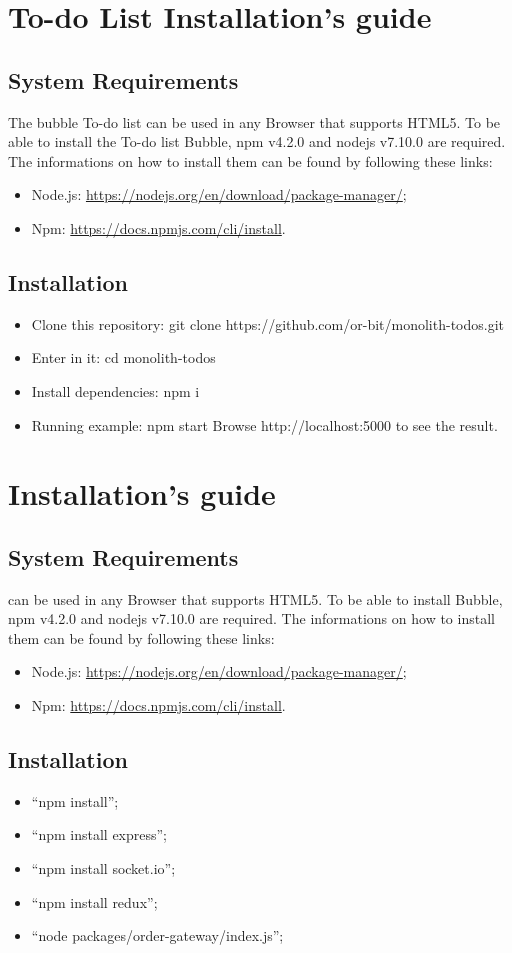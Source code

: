 \section{To-do List Installation's guide}

\subsection{System Requirements}
The bubble To-do list can be used in any Browser that supports HTML5. To be able to install the To-do list Bubble, npm v4.2.0 and nodejs v7.10.0 are required. The informations on how to install them can be found by following these links:
\begin{itemize}
	\item Node.js: \url{https://nodejs.org/en/download/package-manager/};
	\item Npm: \url{https://docs.npmjs.com/cli/install}.
\end{itemize}

\subsection{Installation}
\begin{itemize}
\item Clone this repository: git clone https://github.com/or-bit/monolith-todos.git
\item Enter in it: cd monolith-todos
\item Install dependencies: npm i
\item Running example: npm start Browse http://localhost:5000 to see the result.
\end{itemize}

\section{\DemoName{} Installation's guide}

\subsection{ \DemoName{} System Requirements}
\DemoName{} can be used in any Browser that supports HTML5. 
To be able to install \DemoName{} Bubble, npm v4.2.0 and nodejs v7.10.0 are required. The informations on how to install them can be found by following these links:
\begin{itemize}
	\item Node.js: \url{https://nodejs.org/en/download/package-manager/};
	\item Npm: \url{https://docs.npmjs.com/cli/install}.
\end{itemize}

\subsection{Installation}


\begin{itemize}
	\item ``npm install'';
	\item ``npm install express'';
	\item ``npm install socket.io'';
	\item ``npm install redux'';
	\item ``node packages/order-gateway/index.js'';
\end{itemize}
